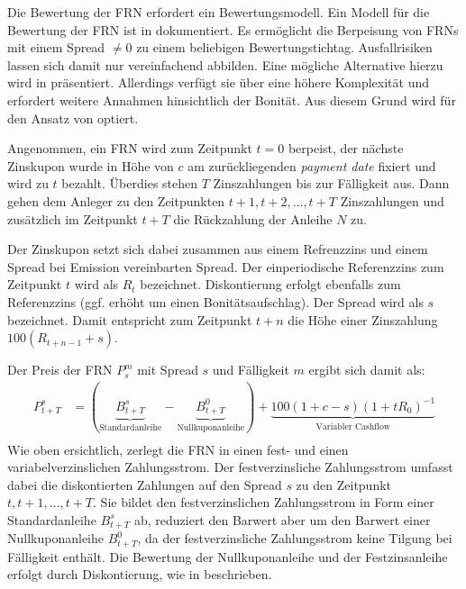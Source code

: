 \documentclass[12pt, a4paper]{article}
\theoremstyle{plain}
\begin{document}


Die Bewertung der \gls{FRN} erfordert ein Bewertungsmodell. Ein Modell für die Bewertung der \gls{FRN} ist in \textcite[][S.~31~f.]{alexander_market_2008} dokumentiert. 
Es ermöglicht die Berpeisung von \glspl{FRN} mit einem Spread $\neq0$ zu einem beliebigen Bewertungstichtag.
Ausfallrisiken lassen sich damit nur vereinfachend abbilden.
Eine mögliche Alternative hierzu wird in \textcite[][S.~65~f.]{schonbucher_credit_2003} präsentiert. Allerdings verfügt sie über eine höhere Komplexität und erfordert weitere Annahmen hinsichtlich der Bonität. Aus diesem Grund wird für den Ansatz von \autocite[][S.~31~f.]{alexander_market_2008} optiert.

Angenommen, ein \gls{FRN} wird zum Zeitpunkt $t = 0$ berpeist, der nächste Zinskupon wurde in Höhe von $c$ am zurückliegenden \textit{payment date} fixiert und wird zu $t$ bezahlt. Überdies stehen $T$ Zinszahlungen bis zur Fälligkeit aus. Dann gehen dem Anleger zu den Zeitpunkten $t+1, t+2, \ldots, t+T$ Zinszahlungen und zusätzlich im Zeitpunkt $t+T$ die Rückzahlung der Anleihe $N$ zu.

Der Zinskupon setzt sich dabei zusammen aus einem Refrenzzins und einem Spread bei Emission vereinbarten Spread. Der einperiodische Referenzzins zum Zeitpunkt $t$ wird als $R_t$ bezeichnet. Diskontierung erfolgt ebenfalls zum Referenzzins (ggf. erhöht um einen Bonitätsaufschlag). Der Spread wird als $s$ bezeichnet. Damit entspricht zum Zeitpunkt $t+n$ die Höhe einer Zinszahlung $100(R_{t+n-1}+s)$. 

Der Preis der \gls{FRN} $P_{s}^{m}$ mit Spread $s$ und Fälligkeit $m$ ergibt sich damit als:
\begin{align*}
	P_{t+T}^{s}&=(\underbrace{B_{t+T}^{s}}_\text{Standardanleihe}-\underbrace{B_{t+T}^{0}}_\text{Nullkuponanleihe})+\underbrace{100(1+c - s)(1+t R_{0})^{-1}}_\text{Variabler Cashflow}\\
\end{align*}
Wie oben ersichtlich, zerlegt \textcite[][31]{alexander_market_2008} die \gls{FRN} in einen fest- und einen variabelverzinslichen Zahlungsstrom. Der festverzinsliche Zahlungsstrom umfasst dabei die diskontierten Zahlungen auf den Spread $s$ zu den Zeitpunkt $t, t+1, \ldots, t+T$. Sie bildet den festverzinslichen Zahlungsstrom in Form einer Standardanleihe $B_{t+T}^{s}$ ab, reduziert den Barwert aber um den Barwert einer Nullkuponanleihe $B_{t+T}^{0}$, da der festverzinsliche Zahlungsstrom keine Tilgung bei Fälligkeit enthält. Die Bewertung der Nullkuponanleihe und der Festzinsanleihe erfolgt durch Diskontierung, wie in \textcite[][11]{alexander_market_2008} beschrieben.
\end{document}
